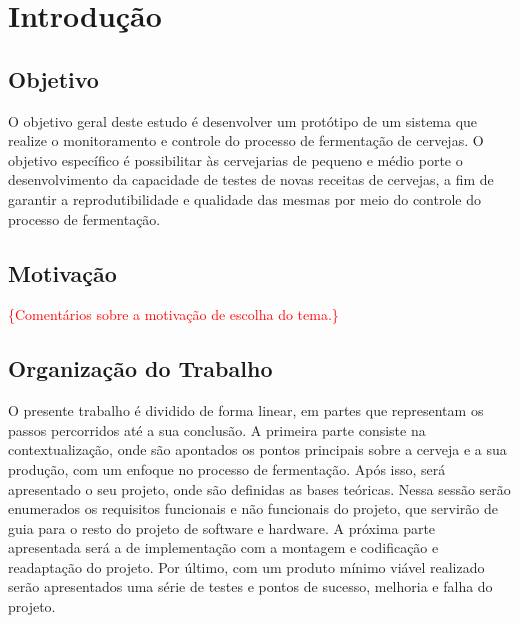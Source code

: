 \chapter{Introdução}

\section{Objetivo}

O objetivo geral deste estudo é desenvolver um protótipo de um sistema que realize o monitoramento e controle do processo de fermentação de cervejas.
O objetivo específico é possibilitar às cervejarias de pequeno e médio porte o desenvolvimento da capacidade de testes de novas receitas de cervejas, 
a fim de garantir a reprodutibilidade e qualidade das mesmas por meio do controle do processo de fermentação.

\section{Motivação}
\textcolor{red}{\{Comentários sobre a motivação de escolha do tema.\}}

\section{Organização do Trabalho}


O presente trabalho é dividido de forma linear, em partes que representam os passos percorridos até a sua conclusão. A primeira parte consiste na contextualização, onde são apontados os pontos principais sobre a cerveja e a sua produção, com um enfoque no processo de fermentação. Após isso, será apresentado o seu projeto, onde são definidas as bases teóricas. Nessa sessão serão enumerados os requisitos funcionais e não funcionais do projeto, que servirão de guia para o resto do projeto de software e hardware. A próxima parte apresentada será a de implementação com a montagem e codificação e readaptação do projeto. Por último, com um produto mínimo viável realizado serão apresentados uma série de testes e pontos de sucesso, melhoria e falha do projeto. 


